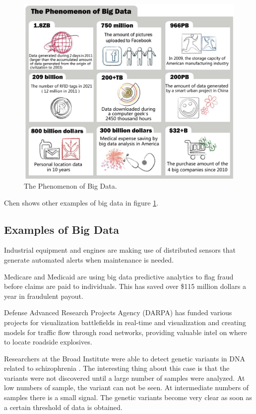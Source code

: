 \documentclass[]{article}
\begin{document}
\begin{figure}
	\centering
	\includegraphics[width=0.8\linewidth]{img/big-data}
	\caption[The Phenomenon of Big Data.]{The Phenomenon of Big Data.\cite{chen_big_2014}}
	\label{fig:big-data}
\end{figure}

Chen shows other examples of big data in figure \ref{fig:big-data}.

\subsection{Examples of Big Data}
Industrial equipment and engines are making use of distributed sensors that generate automated alerts when maintenance is needed\cite{destiche}.

Medicare and Medicaid are using big data predictive analytics to flag fraud before claims are paid to individuals. This has saved over \$115 million dollars a year in fraudulent payout\cite{medicaid}.

Defense Advanced Research Projects Agency (DARPA) has funded various projects for visualization battlefields in real-time and visualization and creating models for traffic flow through road networks, providing valuable intel on where to locate roadside explosives\cite{pcast}.

Researchers at the Broad Institute were able to detect genetic variants in DNA related to schizophrenia \cite{pcast}. The interesting thing about this case is that the variants were not discovered until a large number of samples were analyzed. At low numbers of sample, the variant can not be seen. At intermediate numbers of samples there is a small signal. The genetic  variants become very clear as soon as a certain threshold of data is obtained.
\end{document}
